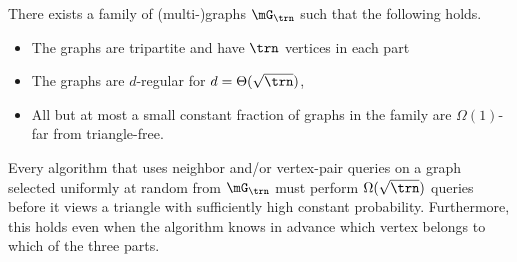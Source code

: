 \begin{lemma}\label{lem:tri_free_hard_family}
There exists a family of (multi-)graphs $\mG_{\trn}$ such that 
the following holds.
\begin{itemize}
    \item The graphs  are tripartite and have $\trn$ vertices in each part
    \item The graphs are $d$-regular for $d=\Theta(\sqrt{\trn})$, 
    \item All but at most a small constant fraction of  graphs in the family  are $\Omega(1)$-far from triangle-free. 
\end{itemize}

Every algorithm that uses neighbor
and/or vertex-pair queries on a graph selected uniformly at random from  $\mG_{\trn}$ must perform $\Omega(\sqrt{\trn})$ queries before it 
views a triangle with sufficiently high constant probability.  
Furthermore, this holds even when the algorithm knows in advance which vertex belongs to which of the three parts.
\end{lemma}


